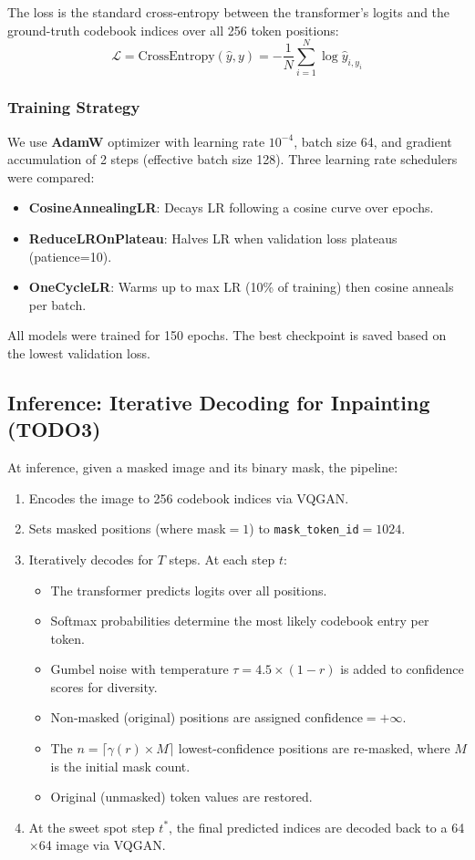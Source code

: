 \documentclass[10pt,twocolumn,letterpaper]{article}
\begin{document}
The loss is the standard cross-entropy between the transformer's logits and the ground-truth codebook indices over all 256 token positions:
\[
	\mathcal{L} = \text{CrossEntropy}(\hat{y}, y) = -\frac{1}{N}\sum_{i=1}^{N} \log \hat{y}_{i, y_i}
\]

\subsubsection{Training Strategy}
We use \textbf{AdamW} optimizer with learning rate $10^{-4}$, batch size 64, and gradient accumulation of 2 steps (effective batch size 128). Three learning rate schedulers were compared:
\begin{itemize}
	\item \textbf{CosineAnnealingLR}: Decays LR following a cosine curve over epochs.
	\item \textbf{ReduceLROnPlateau}: Halves LR when validation loss plateaus (patience=10).
	\item \textbf{OneCycleLR}: Warms up to max LR (10\% of training) then cosine anneals per batch.
\end{itemize}

All models were trained for 150 epochs. The best checkpoint is saved based on the lowest validation loss.

\subsection{Inference: Iterative Decoding for Inpainting (TODO3)}

At inference, given a masked image and its binary mask, the pipeline:
\begin{enumerate}
	\item Encodes the image to 256 codebook indices via VQGAN.
	\item Sets masked positions (where mask${}=1$) to \texttt{mask\_token\_id}${}=1024$.
	\item Iteratively decodes for $T$ steps. At each step $t$:
	      \begin{itemize}
		      \item The transformer predicts logits over all positions.
		      \item Softmax probabilities determine the most likely codebook entry per token.
		      \item Gumbel noise with temperature $\tau = 4.5 \times (1 - r)$ is added to confidence scores for diversity.
		      \item Non-masked (original) positions are assigned $\text{confidence} = +\infty$.
		      \item The $n = \lceil \gamma(r) \times M \rceil$ lowest-confidence positions are re-masked, where $M$ is the initial mask count.
		      \item Original (unmasked) token values are restored.
	      \end{itemize}
	\item At the sweet spot step $t^*$, the final predicted indices are decoded back to a 64$\times$64 image via VQGAN.
\end{enumerate}
\end{document}
